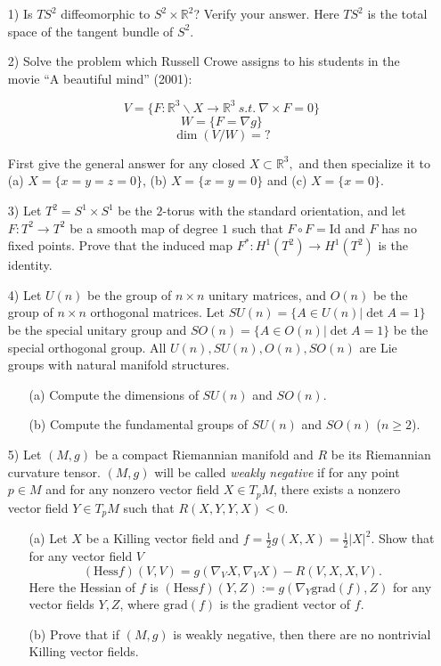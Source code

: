 \documentclass[10pt]{article}
\renewcommand{\geq}{\geqslant}
\begin{document}
\begin{enumerate}
\item [1)] Is $TS^2$ diffeomorphic to $S^2\times \mathbb{R}^2$? Verify your answer. Here $TS^2$ is the total space of the tangent bundle of $S^2$.



\item [2)] Solve the problem which Russell Crowe assigns to his students in the movie ``A beautiful mind'' (2001):

$$V=\{F:\mathbb{R}^3\backslash X\to\mathbb{R}^3\ s.t.\ \nabla\times F=0\}$$
$$W=\{F=\nabla g\}$$
$$\dim \left(V/W\right)=?$$

First give the general answer for any closed $X\subset\mathbb{R}^3,$ and then specialize it to (a) $X=\{x=y=z=0\}$, (b) $X=\{x=y=0\}$ and (c) $X=\{x=0\}$.


\item [3)] Let $T^2=S^1\times S^1$ be the $2$-torus with the standard orientation, and let $F:T^2\to T^2$ be a smooth map of degree $1$ such that $F\circ F=\mathrm{Id}$ and $F$ has no fixed points. Prove that
the induced map $F^*:H^1(T^2)\to H^1(T^2)$ is the identity.

\item [4)]  Let $U(n)$ be the group of $n\times n$ unitary matrices, and $O(n)$ be the group of $n\times n$ orthogonal matrices. Let $SU(n)=\{A\in U(n)| \det A=1\}$ be the special unitary group and $SO(n)=\{A\in O(n)| \det A=1\}$ be the special orthogonal group. All  $U(n), SU(n), O(n), SO(n)$ are Lie groups with natural manifold structures.
\begin{enumerate}
\item [(a)] Compute the dimensions of $SU(n)$ and  $SO(n)$.
\item [(b)] Compute the fundamental groups of $SU(n)$ and $SO(n)$ ($n\geq 2$).
\end{enumerate}

\item [5)] Let $(M,g)$ be a compact Riemannian manifold and $R$ be its Riemannian curvature tensor.
$(M,g)$ will be called \emph{weakly negative} if for any point $p\in M$ and for
any nonzero vector field $X\in T_pM$, there exists a nonzero vector
field $Y\in T_pM$ such that $R(X,Y,Y,X)<0$.
 \begin{itemize}

\item[(a)] Let $X$ be a Killing vector field and
$f=\frac{1}{2}g(X,X)=\frac{1}{2}|X|^2$. Show that for any vector
field $V$
$$\left(\text{Hess} f\right)(V,V)=g(\nabla_V X, \nabla_V
X)-R(V,X,X,V).$$
Here the Hessian of $f$ is $\left(\text{Hess} f\right)(Y,Z):=g(\nabla_Y\text{grad}(f),Z)$ for any
vector fields $Y,Z$, where $\text{grad}(f)$ is the gradient vector of $f$.
\item[(b)]
 Prove that if $(M,g)$
is weakly negative,  then there are no nontrivial Killing vector fields.
\end{itemize}


\end{enumerate}
\end{document}
